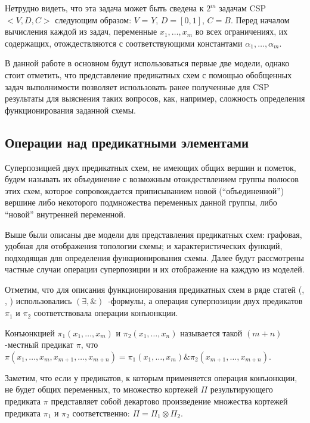 \documentclass[12pt]{article}
\newenvironment{definition}[1][Определение]{\begin{trivlist}
\item[\hskip \labelsep {\bfseries #1}]}{\end{trivlist}}
\begin{document}
Нетрудно видеть, что эта задача может быть сведена к $2^m$ задачам CSP $<V, D, C>$ следующим образом:
$V$ = $Y$, $D = [0, 1]$, $C = B$. Перед началом вычисления каждой из задач, переменные $x_1, \ldots , x_m$ 
во всех ограничениях, их содержащих, отождествляются с соответствующими константами $\alpha_1, \ldots , \alpha_m$.

В данной работе в основном будут использоваться первые две модели, однако стоит отметить, что представление предикатных
схем с помощью обобщенных задач выполнимости позволяет использовать ранее полученные для CSP результаты для 
выяснения таких вопросов, как, например, сложность определения функционирования заданной схемы.

\subsection{Операции над предикатными элементами}

\begin{definition}
Суперпозицией двух предикатных схем, не имеющих общих вершин и пометок, 
будем называть их объединение с возможным отождествлением группы полюсов этих схем, 
которое сопровождается приписыванием новой (``объединенной'') вершине либо 
некоторого подмножества переменных данной группы, либо ``новой'' внутренней переменной.
\end{definition}

Выше были описаны две модели для представления предикатных схем: графовая, удобная для отображения топологии схемы; 
и характеристических функций, подходящая для определения функционирования схемы. Далее 
будут рассмотрены частные случаи операции суперпозиции и их отображение на каждую из моделей.

Отметим, что для описания функционирования предикатных схем в ряде статей (\cite{Marchenkov}, \cite{Zhuk}, \cite{Shu09})
использовались $(\exists, \&)$~-формулы, а операция суперпозиции двух предикатов $\pi_1$ и $\pi_2$ соответствовала
операции конъюнкции.

\begin{definition}
Конъюнкцией $\pi_1(x_1, \dots, x_m)$ и $\pi_2(x_1, \dots, x_n)$ называется такой $(m+n)$-местный предикат $\pi$, что
$\pi(x_1, \dots, x_m, x_{m+1}, \dots, x_{m+n}) = \pi_1(x_1, \dots, x_m) \& \pi_2(x_{m+1}, \dots, x_{m+n})$.
\end{definition}

Заметим, что если у предикатов, к которым применяется операция конъюнкции,
не будет общих переменных, то множество кортежей $\Pi$ результирующего предиката 
$\pi$ представляет собой декартово произведение множества кортежей предиката $\pi_1$ и $\pi_2$ соответственно:
$\Pi = \Pi_1 \otimes \Pi_2$.
\end{document}
